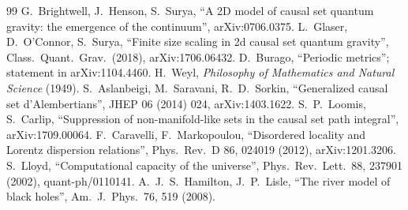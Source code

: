 \documentclass[11pt,a4paper]{article}
\begin{document}
\begin{thebibliography}{99}
 G.~Brightwell, J.~Henson, S.~Surya, ``A 2D model of causal set quantum gravity: the emergence of the continuum'', arXiv:0706.0375.
 L.~Glaser, D.~O'Connor, S.~Surya, ``Finite size scaling in 2d causal set quantum gravity'', Class.\ Quant.\ Grav.\ (2018), arXiv:1706.06432.
 D.~Burago, ``Periodic metrics''; statement in arXiv:1104.4460.
 H.~Weyl, \emph{Philosophy of Mathematics and Natural Science} (1949).
 S.~Aslanbeigi, M.~Saravani, R.~D.~Sorkin, ``Generalized causal set d'Alembertians'', JHEP 06 (2014) 024, arXiv:1403.1622.
 S.~P.~Loomis, S.~Carlip, ``Suppression of non-manifold-like sets in the causal set path integral'', arXiv:1709.00064.
 F.~Caravelli, F.~Markopoulou, ``Disordered locality and Lorentz dispersion relations'', Phys.\ Rev.\ D 86, 024019 (2012), arXiv:1201.3206.
 S.~Lloyd, ``Computational capacity of the universe'', Phys.\ Rev.\ Lett.\ 88, 237901 (2002), quant-ph/0110141.
 A.~J.~S.~Hamilton, J.~P.~Lisle, ``The river model of black holes'', Am.\ J.\ Phys.\ 76, 519 (2008).
\end{thebibliography}
\end{document}
